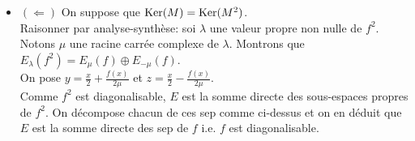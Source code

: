 \begin{preuve}
\begin{itemize}
\begin{itemize}
        \end{itemize}
        \item $(\Leftarrow)$ On suppose que $\mathrm{Ker}(M) = \mathrm{Ker}(M^2)$. \\
        Raisonner par analyse-synthèse: soi $\lambda$ une valeur propre non nulle de $f^2$. Notons $\mu$ une racine carrée complexe de $\lambda$. Montrons que $E_{\lambda}(f^2) = E_{\mu}(f) \oplus E_{-\mu}(f)$. \\
        On pose $y = \frac{x}{2} + \frac{f(x)}{2 \mu}$ et $z = \frac{x}{2} - \frac{f(x)}{2 \mu}$. \\
        Comme $f^2$ est diagonalisable, $E$ est la somme directe des sous-espaces propres de $f^2$. On décompose chacun de ces sep comme ci-dessus et on en déduit que $E$ est la somme directe des sep de $f$ i.e. $f$ est diagonalisable. 
    \end{itemize}
\end{preuve}
